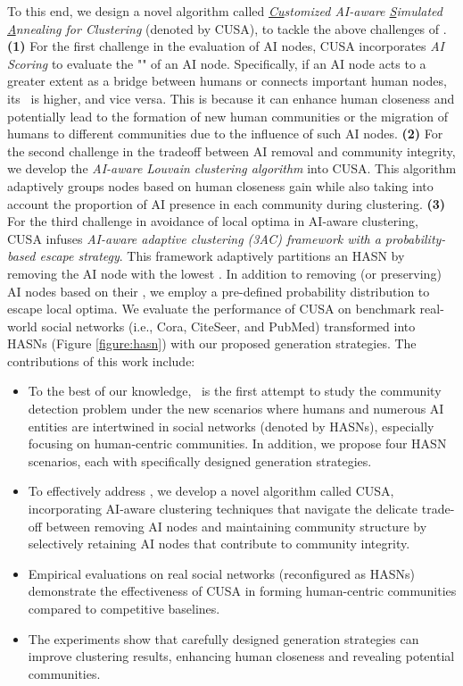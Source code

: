 To this end, we design a novel algorithm called \textit{\underline{Cu}stomized AI-aware \underline{S}imulated \underline{A}nnealing for Clustering} (denoted by CUSA), to tackle the above challenges of \problem. \textbf{(1)} For the first challenge in the evaluation of AI nodes, CUSA incorporates \textit{AI Scoring} to evaluate the "\score" of an AI node. Specifically, if an AI node acts to a greater extent as a bridge between humans or connects important human nodes, its \score\ is higher, and vice versa. This is because it can enhance human closeness and potentially lead to the formation of new human communities or the migration of humans to different communities due to the influence of such AI nodes. \textbf{(2)} For the second challenge in the tradeoff between AI removal and community integrity, we develop the \textit{AI-aware Louvain clustering algorithm} into CUSA. This algorithm adaptively groups nodes based on human closeness gain while also taking into account the proportion of AI presence in each community during clustering. \textbf{(3)} For the third challenge in avoidance of local optima in AI-aware clustering, CUSA infuses \textit{AI-aware adaptive clustering (3AC) framework with a probability-based escape strategy}. This framework adaptively partitions an HASN by removing the AI node with the lowest \score. In addition to removing (or preserving) AI nodes based on their \score, we employ a pre-defined probability distribution to escape local optima. We evaluate the performance of CUSA on benchmark real-world social networks (i.e., Cora,  CiteSeer, and PubMed) transformed into HASNs (Figure \ref{figure:hasn}) with our proposed generation strategies. The contributions of this work include:

\begin{itemize}
    \item To the best of our knowledge, \problem\ is the first attempt to study the community detection problem under the new scenarios where humans and numerous AI entities are intertwined in social networks (denoted by HASNs), especially focusing on human-centric communities. In addition, we propose four HASN scenarios, each with specifically designed generation strategies.
    
    \item To effectively address \problem, we develop a novel algorithm called CUSA, incorporating AI-aware clustering techniques that navigate the delicate trade-off between removing AI nodes and maintaining community structure by selectively retaining AI nodes that contribute to community integrity. 
    
    \item Empirical evaluations on real social networks (reconfigured as HASNs) demonstrate the effectiveness of CUSA in forming human-centric communities compared to competitive baselines.

    \item The experiments show that carefully designed generation strategies can improve clustering results, enhancing human closeness and revealing potential communities.
    
\end{itemize}

